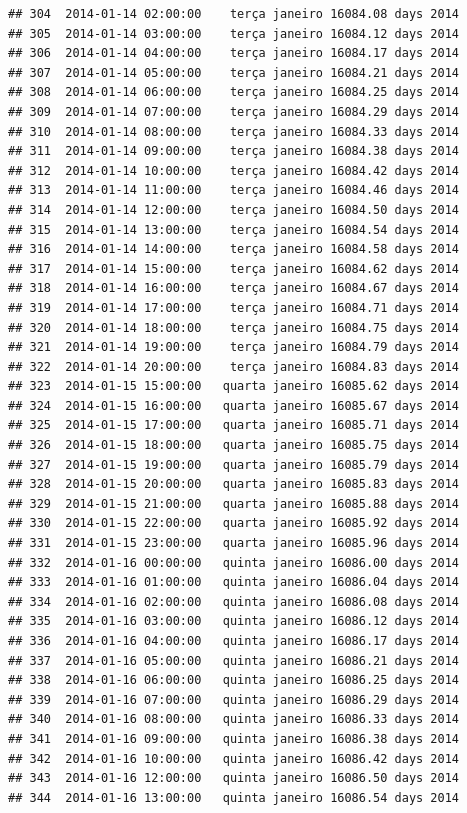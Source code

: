 \documentclass[]{book}
\begin{document}
\begin{verbatim}
## 304  2014-01-14 02:00:00    terça janeiro 16084.08 days 2014
## 305  2014-01-14 03:00:00    terça janeiro 16084.12 days 2014
## 306  2014-01-14 04:00:00    terça janeiro 16084.17 days 2014
## 307  2014-01-14 05:00:00    terça janeiro 16084.21 days 2014
## 308  2014-01-14 06:00:00    terça janeiro 16084.25 days 2014
## 309  2014-01-14 07:00:00    terça janeiro 16084.29 days 2014
## 310  2014-01-14 08:00:00    terça janeiro 16084.33 days 2014
## 311  2014-01-14 09:00:00    terça janeiro 16084.38 days 2014
## 312  2014-01-14 10:00:00    terça janeiro 16084.42 days 2014
## 313  2014-01-14 11:00:00    terça janeiro 16084.46 days 2014
## 314  2014-01-14 12:00:00    terça janeiro 16084.50 days 2014
## 315  2014-01-14 13:00:00    terça janeiro 16084.54 days 2014
## 316  2014-01-14 14:00:00    terça janeiro 16084.58 days 2014
## 317  2014-01-14 15:00:00    terça janeiro 16084.62 days 2014
## 318  2014-01-14 16:00:00    terça janeiro 16084.67 days 2014
## 319  2014-01-14 17:00:00    terça janeiro 16084.71 days 2014
## 320  2014-01-14 18:00:00    terça janeiro 16084.75 days 2014
## 321  2014-01-14 19:00:00    terça janeiro 16084.79 days 2014
## 322  2014-01-14 20:00:00    terça janeiro 16084.83 days 2014
## 323  2014-01-15 15:00:00   quarta janeiro 16085.62 days 2014
## 324  2014-01-15 16:00:00   quarta janeiro 16085.67 days 2014
## 325  2014-01-15 17:00:00   quarta janeiro 16085.71 days 2014
## 326  2014-01-15 18:00:00   quarta janeiro 16085.75 days 2014
## 327  2014-01-15 19:00:00   quarta janeiro 16085.79 days 2014
## 328  2014-01-15 20:00:00   quarta janeiro 16085.83 days 2014
## 329  2014-01-15 21:00:00   quarta janeiro 16085.88 days 2014
## 330  2014-01-15 22:00:00   quarta janeiro 16085.92 days 2014
## 331  2014-01-15 23:00:00   quarta janeiro 16085.96 days 2014
## 332  2014-01-16 00:00:00   quinta janeiro 16086.00 days 2014
## 333  2014-01-16 01:00:00   quinta janeiro 16086.04 days 2014
## 334  2014-01-16 02:00:00   quinta janeiro 16086.08 days 2014
## 335  2014-01-16 03:00:00   quinta janeiro 16086.12 days 2014
## 336  2014-01-16 04:00:00   quinta janeiro 16086.17 days 2014
## 337  2014-01-16 05:00:00   quinta janeiro 16086.21 days 2014
## 338  2014-01-16 06:00:00   quinta janeiro 16086.25 days 2014
## 339  2014-01-16 07:00:00   quinta janeiro 16086.29 days 2014
## 340  2014-01-16 08:00:00   quinta janeiro 16086.33 days 2014
## 341  2014-01-16 09:00:00   quinta janeiro 16086.38 days 2014
## 342  2014-01-16 10:00:00   quinta janeiro 16086.42 days 2014
## 343  2014-01-16 12:00:00   quinta janeiro 16086.50 days 2014
## 344  2014-01-16 13:00:00   quinta janeiro 16086.54 days 2014

\end{verbatim}
\end{document}
